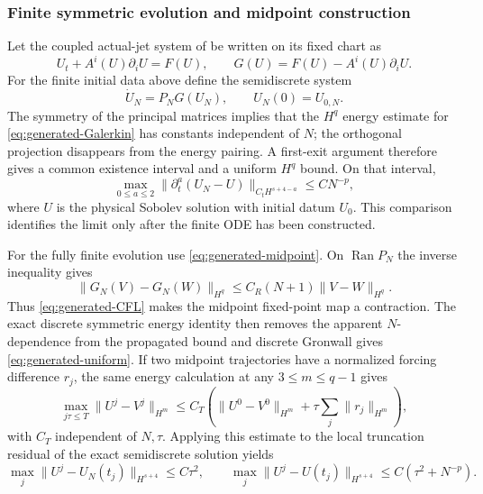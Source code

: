 \documentclass[11pt]{article}
\numberwithin{equation}{section}
\theoremstyle{definition}
\theoremstyle{remark}
\newcommand{\norm}[1]{\lVert#1\rVert}
\begin{document}
\subsubsection{Finite symmetric evolution and midpoint construction}

Let the coupled actual-jet system of  be written on its fixed chart as
\begin{equation}
 U_t+A^i(U)\partial_iU=F(U),
 \qquad G(U)=F(U)-A^i(U)\partial_iU.
 \label{eq:generated-symmetric-system}
\end{equation}
For the finite initial data above define the semidiscrete system
\begin{equation}
 \dot U_N=P_NG(U_N),\qquad U_N(0)=U_{0,N}.
 \label{eq:generated-Galerkin}
\end{equation}
The symmetry of the principal matrices implies that the $H^q$ energy estimate for \eqref{eq:generated-Galerkin} has constants independent of $N$; the orthogonal projection disappears from the energy pairing.  A first-exit argument therefore gives a common existence interval and a uniform $H^q$ bound.  On that interval,
\begin{equation}
 \max_{0\le a\le2}
 \norm{\partial_t^a(U_N-U)}_{C_tH^{s+4-a}}
 \le C N^{-p},
 \label{eq:generated-Galerkin-rate}
\end{equation}
where $U$ is the physical Sobolev solution with initial datum $U_0$.  This comparison identifies the limit only after the finite ODE has been constructed.

For the fully finite evolution use \eqref{eq:generated-midpoint}.  On $\operatorname{Ran}P_N$ the inverse inequality gives
\[
 \norm{G_N(V)-G_N(W)}_{H^q}
 \le C_R(N+1)\norm{V-W}_{H^q}.
\]
Thus \eqref{eq:generated-CFL} makes the midpoint fixed-point map a contraction.  The exact discrete symmetric energy identity then removes the apparent $N$-dependence from the propagated bound and discrete Gronwall gives \eqref{eq:generated-uniform}.  If two midpoint trajectories have a normalized forcing difference $r_j$, the same energy calculation at any $3\le m\le q-1$ gives
\begin{equation}
 \max_{j\tau\le T}\norm{U^j-V^j}_{H^m}
 \le C_T\left(\norm{U^0-V^0}_{H^m}
 +\tau\sum_j\norm{r_j}_{H^m}\right),
 \label{eq:generated-causal}
\end{equation}
with $C_T$ independent of $N,\tau$.  Applying this estimate to the local truncation residual of the exact semidiscrete solution yields
\begin{equation}
 \max_j\norm{U^j-U_N(t_j)}_{H^{s+4}}\le C\tau^2,
 \qquad
 \max_j\norm{U^j-U(t_j)}_{H^{s+4}}
 \le C(\tau^2+N^{-p}).
 \label{eq:generated-time-rate}
\end{equation}
\end{document}
